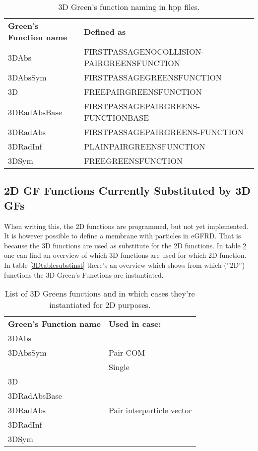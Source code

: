 \documentclass[a4paper,10pt]{article}
\begin{document}
\begin{table}[h!]
\caption{3D Green's function naming in hpp files.}
\label{3Dtableownnames}
\begin{tabular}{ p{} p{} }
  \textbf{Green's Function name} & \textbf{Defined as} \\
3DAbs 		 & FIRSTPASSAGENOCOLLISION\hyp{}PAIRGREENSFUNCTION \\ 		
3DAbsSym 	 & FIRSTPASSAGEGREENSFUNCTION \\
3D 		 & FREEPAIRGREENSFUNCTION \\
3DRadAbsBase 	 & FIRSTPASSAGEPAIRGREENS\hyp{}FUNCTIONBASE \\
3DRadAbs	 & FIRSTPASSAGEPAIRGREENS\hyp{}FUNCTION \\
3DRadInf 	 & PLAINPAIRGREENSFUNCTION \\
3DSym 		 & FREEGREENSFUNCTION \\
\end{tabular}
\end{table}

\subsection{2D GF Functions Currently Substituted by 3D GFs}
\label{2Dsubst}

When writing this, the 2D functions are programmed, but not yet implemented. It is however possible to define a membrane with particles in eGFRD. That is because the 3D functions are used as substitute for the 2D functions. In table \ref{3Dtablesubst} one can find an overview of which 3D functions are used for which 2D function. In table \ref{3Dtablesubstinst} there's an overview which shows from which (''2D'') functions the 3D Green's Functions are instantiated.

\begin{table}[h!]
\caption{List of 3D Greens functions and in which cases they're instantiated for 2D purposes.}
\label{3Dtablesubst}
\begin{tabular}{ p{} p{} }
  \textbf{Green's Function name} & \textbf{Used in case:} \\
3DAbs 		& \\
3DAbsSym 	& Pair COM\\
		& Single \\
3D 		& \\
3DRadAbsBase 	& \\
3DRadAbs	& Pair interparticle vector\\
3DRadInf 	& \\
3DSym 		& \\
\end{tabular}
\end{table}
\end{document}

